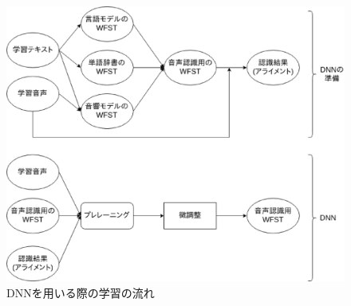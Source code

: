 \begin{figure}[H]
  \begin{center}
    \includegraphics[scale=0.5]{./figure/train_dnn.eps}
  \end{center}
  \caption{DNNを用いる際の学習の流れ \label{fig:flow_train_dnn}}
\end{figure}


